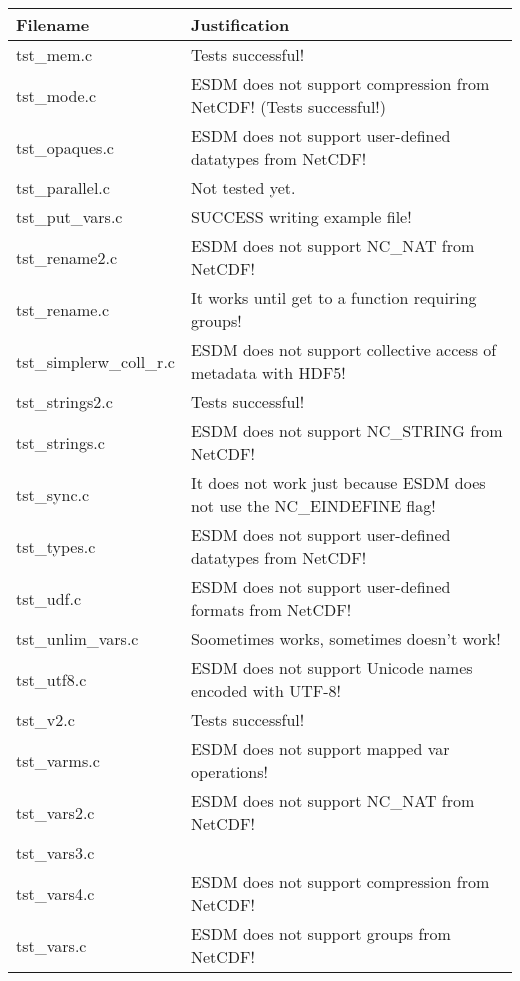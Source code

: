 \clearpage

\begin{table}[H]
\centering
\begin{tabular}{|l|l|}
\hline
Filename & Justification \\ \hline \hline
tst\_mem.c   &    Tests successful!   \\ \hline
tst\_mode.c   &   ESDM does not support compression from NetCDF! (Tests successful!)    \\ \hline
tst\_opaques.c   &  ESDM does not support user-defined datatypes from NetCDF!     \\ \hline
tst\_parallel.c   &   Not tested yet.    \\ \hline
tst\_put\_vars.c   &   SUCCESS writing example file!    \\ \hline
tst\_rename2.c   &  ESDM does not support NC\_NAT from NetCDF!     \\ \hline
tst\_rename.c   &   It works until get to a function requiring groups!  \\ \hline
tst\_simplerw\_coll\_r.c   &   ESDM does not support collective access of metadata with HDF5!  \\ \hline
tst\_strings2.c   &   Tests successful!    \\ \hline
tst\_strings.c   &  ESDM does not support NC\_STRING from NetCDF!     \\ \hline
tst\_sync.c   &  It does not work just because ESDM does not use the NC\_EINDEFINE flag!  \\ \hline
tst\_types.c   &  ESDM does not support user-defined datatypes from NetCDF!     \\ \hline
tst\_udf.c   &   ESDM does not support user-defined formats from NetCDF!   \\ \hline
tst\_unlim\_vars.c   &   Soometimes works, sometimes doesn't work!    \\ \hline
tst\_utf8.c   &   ESDM does not support Unicode names encoded with UTF-8!  \\ \hline
tst\_v2.c   &    Tests successful!   \\ \hline
tst\_varms.c   &   ESDM does not support mapped var operations!  \\ \hline
tst\_vars2.c   &  ESDM does not support NC\_NAT from NetCDF!  \\ \hline
tst\_vars3.c   &       \\ \hline
tst\_vars4.c   &  ESDM does not support compression from NetCDF!     \\ \hline
tst\_vars.c   &    ESDM does not support groups from NetCDF!   \\ \hline

\end{tabular}
\end{table}
